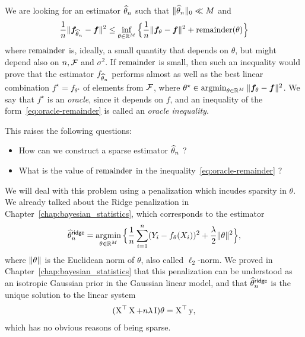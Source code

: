 We are looking for an estimator $\widehat \theta_n$ such that $\| \widehat \theta_n \|_0 \ll M$ and
\begin{equation}
	\label{eq:oracle-remainder}
	\frac 1n \| {\boldsymbol f}_{\widehat \theta_n} - {\boldsymbol f} \|^2 
	\leq \inf_{\theta \in \mathbb R^M} \Big\{ 
	\frac 1n  \| {\boldsymbol f}_\theta - {\boldsymbol f} \|^2 + \operatorname{remainder}(\theta) \Big\}
\end{equation}
where $\operatorname{remainder}$ is, ideally, a small quantity that depends on $\theta$, but might depend also on $n, \operatorname{{\mathcal F}}$ and $\sigma^2$.
If $\operatorname{remainder}$ is small, then such an inequality would prove that the estimator $f_{\widehat \theta_n}$ performs almost as well as the best linear combination $f^\star = f_{\theta^\star}$ of elements from $\operatorname{{\mathcal F}}$, where $\theta^\star \in \operatorname*{argmin}_{\theta \in \mathbb R^M} \| {\boldsymbol f}_\theta - {\boldsymbol f} \|^2$.
We say that $f^\star$ is an \emph{oracle}, since it depends on $f$, and an inequality of the form~\eqref{eq:oracle-remainder} is called an \emph{oracle inequality}.

This raises the following questions:
\begin{itemize}
	\item How can we construct a sparse estimator $\widehat \theta_n$ ?
	\item What is the value of $\operatorname{remainder}$ in the inequality~\eqref{eq:oracle-remainder} ?
\end{itemize}
We will deal with this problem using a penalization which incudes sparsity in $\theta$.
We already talked about the Ridge penalization in Chapter~\ref{chap:bayesian_statistics}, which corresponds to the estimator
\begin{equation}
	\label{eq:chap-lasso-ridge-estimator}
	\widehat \theta_n^{\mathsf{ridge}} = \operatorname*{argmin}_{\theta \in \mathbb R^M} 
	\Big\{ \frac 1n \sum_{i=1}^n (Y_i - f_\theta(X_i))^2 + \frac{\lambda}{2} \| \theta \|^2 \Big\},
\end{equation}
where $\| \theta \|$ is the Euclidean norm of $\theta$, also called $\ell_2$-norm.
We proved in Chapter~\ref{chap:bayesian_statistics} that this penalization can be understood as an isotropic Gaussian prior in the Gaussian linear model, and that $\widehat \theta_n^{\mathsf{ridge}}$ is the unique solution to the linear system
\begin{equation*}
	(\operatorname{{\boldsymbol X}}^\top \operatorname{{\boldsymbol X}} + n \lambda \operatorname{{\boldsymbol I}}) \theta = \operatorname{{\boldsymbol X}}^\top \operatorname{{\boldsymbol y}},
\end{equation*}
which has no obvious reasons of being sparse.

